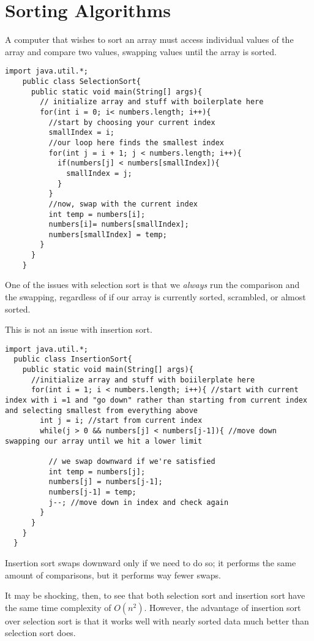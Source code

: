 \documentclass[10pt]{mypackage}
\begin{document}
  \section{Sorting Algorithms}%
  A computer that wishes to sort an array must access individual values of the array and compare two values, swapping values until the array is sorted.
  \begin{lstlisting}[style=javastyle,title=Selection Sort]
    import java.util.*;
    public class SelectionSort{
      public static void main(String[] args){
        // initialize array and stuff with boilerplate here
        for(int i = 0; i< numbers.length; i++){
          //start by choosing your current index
          smallIndex = i;
          //our loop here finds the smallest index
          for(int j = i + 1; j < numbers.length; i++){
            if(numbers[j] < numbers[smallIndex]){
              smallIndex = j;
            }
          }
          //now, swap with the current index
          int temp = numbers[i];
          numbers[i]= numbers[smallIndex];
          numbers[smallIndex] = temp;
        }
      }
    }
  \end{lstlisting}
  One of the issues with selection sort is that we \textit{always} run the comparison and the swapping, regardless of if our array is currently sorted, scrambled, or almost sorted.\newline

  This is not an issue with insertion sort.
  \begin{lstlisting}[style=javastyle,title=Insertion Sort]
  import java.util.*;
  public class InsertionSort{
    public static void main(String[] args){
      //initialize array and stuff with boiilerplate here
      for(int i = 1; i < numbers.length; i++){ //start with current index with i =1 and "go down" rather than starting from current index and selecting smallest from everything above
        int j = i; //start from current index
        while(j > 0 && numbers[j] < numbers[j-1]){ //move down swapping our array until we hit a lower limit

          // we swap downward if we're satisfied
          int temp = numbers[j];
          numbers[j] = numbers[j-1];
          numbers[j-1] = temp;
          j--; //move down in index and check again
        }
      }
    }
  }
  \end{lstlisting}
  Insertion sort swaps downward only if we need to do so; it performs the same amount of comparisons, but it performs way fewer swaps.\newline

  It may be shocking, then, to see that both selection sort and insertion sort have the same time complexity of $O\left(n^2\right)$. However, the advantage of insertion sort over selection sort is that it works well with nearly sorted data much better than selection sort does.
\end{document}
